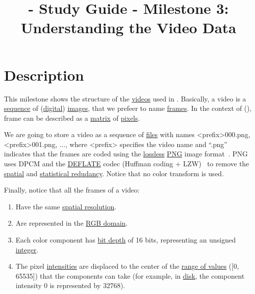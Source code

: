 
\title{\SM{} - Study Guide - Milestone 3: Understanding the Video Data}

\maketitle

\section{Description}

This milestone shows the structure of the
\href{https://en.wikipedia.org/wiki/Video}{videos} used in
\theproject{}. Basically, a video is a
\href{https://en.wikipedia.org/wiki/Sequence}{sequence} of
(\href{https://en.wikipedia.org/wiki/Digital_data}{digital})
\href{https://en.wikipedia.org/wiki/Image}{images}, that we prefeer to
name \href{https://en.wikipedia.org/wiki/Film_frame}{frames}. In the
context of \theproject(), frame can be described as a
\href{https://en.wikipedia.org/wiki/Matrix_(mathematics)}{matrix} of
\href{https://en.wikipedia.org/wiki/Pixel}{pixels}.

We are going to store a video as a sequence of
\href{https://en.wikipedia.org/wiki/Computer_file}{files} with names
<prefix>000.png, <prefix>001.png, ..., where <prefix> specifies the
video name and ``.png'' indicates that the frames are coded using the
\href{https://en.wikipedia.org/wiki/Lossless_compression}{lossless}
\href{https://en.wikipedia.org/wiki/Portable_Network_Graphics}{PNG}
image format~\cite{roelofs1999png}. PNG uses DPCM and the
\href{https://en.wikipedia.org/wiki/DEFLATE}{DEFLATE} codec (Huffman
coding + LZW)~\cite{nelson96datacompression} to remove the
\href{https://en.wikipedia.org/wiki/Image_compression}{spatial} and
\href{https://en.wikipedia.org/wiki/Data_compression}{statistical
  redudancy}. Notice that no color transform is used.

Finally, notice that all the frames of a video:
\begin{enumerate}
\item Have the same
  \href{https://en.wikipedia.org/wiki/Image_resolution}{spatial
    resolution}.
\item Are represented in the
  \href{https://en.wikipedia.org/wiki/RGB_color_model}{RGB domain}.
\item Each color component has
  \href{https://en.wikipedia.org/wiki/Glossary_of_computer_graphics#bit_depth}{bit
    depth} of 16 bits, representing an unsigned
  \href{https://en.wikipedia.org/wiki/Integer_(computer_science)}{integer}.
\item The pixel
  \href{https://en.wikipedia.org/wiki/Luminous_intensity}{intensities}
  are displaced to the center of the
  \href{https://en.wikipedia.org/wiki/Range_(computer_programming)}{range
    of values} ([0, 65535]) that the components can take (for example,
  in \href{https://en.wikipedia.org/wiki/Disk_storage}{disk}, the
  component intensity 0 is represented by 32768).
\end{enumerate}
  
